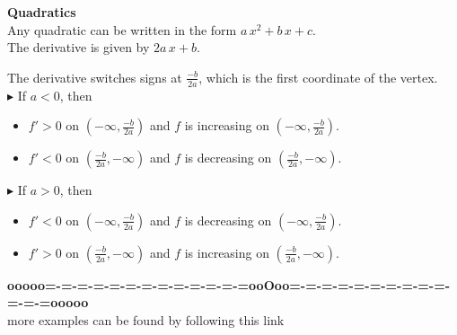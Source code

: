 \documentclass{ximera}
\begin{document}
\begin{example} \textbf{\textcolor{blue!55!black}{Quadratics}} \\


Any quadratic can be written in the form $a \, x^2 + b \, x + c$. \\

The derivative is given by $2a \, x + b$.


The derivative switches signs at $\frac{-b}{2a}$, which is the first coordinate of the vertex. \\



\textbf{\textcolor{red!90!darkgray}{$\blacktriangleright$}} If $a < 0$, then 

\begin{itemize}
\item $f' > 0$ on $\left( -\infty, \frac{-b}{2a} \right)$ and $f$ is increasing on $\left( -\infty, \frac{-b}{2a} \right)$. \\
\item $f' < 0$ on $\left( \frac{-b}{2a}, -\infty \right)$ and $f$ is decreasing on $\left( \frac{-b}{2a}, -\infty \right)$. 
\end{itemize}







\textbf{\textcolor{red!90!darkgray}{$\blacktriangleright$}} If $a > 0$, then 

\begin{itemize}
\item $f' < 0$ on $\left( -\infty, \frac{-b}{2a} \right)$ and $f$ is decreasing on $\left( -\infty, \frac{-b}{2a} \right)$. \\
\item $f' > 0$ on $\left( \frac{-b}{2a}, -\infty \right)$ and $f$ is increasing on $\left( \frac{-b}{2a}, -\infty \right)$. 
\end{itemize}






\end{example}


























\begin{center}
\textbf{\textcolor{green!50!black}{ooooo=-=-=-=-=-=-=-=-=-=-=-=-=ooOoo=-=-=-=-=-=-=-=-=-=-=-=-=ooooo}} \\

more examples can be found by following this link\\ 

\end{center}
\end{document}
